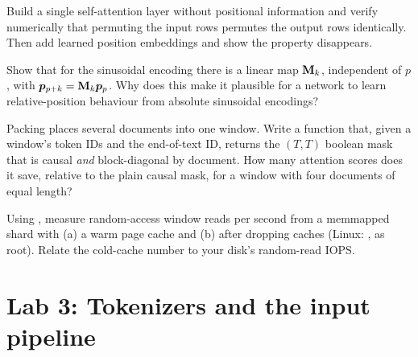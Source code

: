 \begin{exercise}
Build a single self-attention layer without positional information and verify numerically that
permuting the input rows permutes the output rows identically. Then add learned position
embeddings and show the property disappears.
\end{exercise}

\begin{exercise}[sinusoids]
Show that for the sinusoidal encoding there is a linear map $\mathbf{M}_k$, independent of $p$, with
$\bm{p}_{p+k} = \mathbf{M}_k \bm{p}_p$. Why does this make it plausible for a network to learn
relative-position behaviour from absolute sinusoidal encodings?
\end{exercise}

\begin{exercise}
Packing places several documents into one window. Write a function that, given a window's token IDs
and the end-of-text ID, returns the $(T,T)$ boolean mask that is causal \emph{and} block-diagonal by
document. How many attention scores does it save, relative to the plain causal mask, for a window
with four documents of equal length?
\end{exercise}

\begin{exercise}
Using , measure random-access window reads per second from a
memmapped shard with (a) a warm page cache and (b) after dropping caches (Linux:
, as root). Relate the cold-cache number to your disk's
random-read IOPS.
\end{exercise}

\section{Lab 3: Tokenizers and the input pipeline}\label{sec:text:lab}

